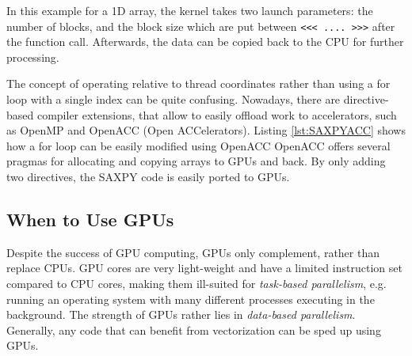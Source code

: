In this example for a 1D array, the kernel takes two launch parameters: the number of blocks, and the block size which are put between \texttt{{<}{<}{<} .... {>}{>}{>}} after the function call. Afterwards, the data can be copied back to the CPU for further processing. 

The concept of operating relative to thread coordinates rather than using a for loop with a single index can be quite confusing. Nowadays, there are directive-based compiler extensions, that allow to easily offload work to accelerators, such as OpenMP and OpenACC (Open ACCelerators). Listing \ref{lst:SAXPYACC} shows how a for loop can be easily modified using OpenACC
\noindent OpenACC offers several pragmas for allocating and copying arrays to GPUs and back. By only adding two directives, the SAXPY code is easily ported to GPUs. 

\subsection{When to Use GPUs}

Despite the success of GPU computing, GPUs only complement, rather than replace CPUs. GPU cores are very light-weight and have a limited instruction set compared to CPU cores, making them ill-suited for \emph{task-based parallelism}, e.g. running an operating system with many different processes executing in the background. The strength of GPUs rather lies in \emph{data-based parallelism}. Generally, any code that can benefit from vectorization can be sped up using GPUs. 
